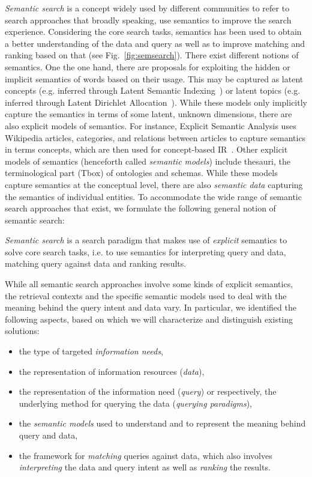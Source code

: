 \emph{Semantic search} is a concept widely used by different communities to refer to search approaches that broadly speaking, use semantics to improve the search experience. Considering the core search tasks, semantics has been used to obtain a better understanding of the data and query as well as to improve matching and ranking based on that (see Fig.~\ref{fig:semsearch}). There exist different notions of semantics. One the one hand, there are proposals for exploiting the hidden or implicit semantics of words based on their usage. This may be captured as latent concepts (e.g. inferred through Latent Semantic Indexing~\cite{DBLP:conf/sigir/Hofmann99}) or latent topics (e.g. inferred through Latent Dirichlet Allocation~\cite{DBLP:conf/sigir/WeiC06}). While these models only implicitly capture the semantics in terms of some latent, unknown dimensions, there are also explicit models of semantics. For instance, Explicit Semantic Analysis uses Wikipedia articles, categories, and relations between articles to capture semantics in terms concepts, which are then used for concept-based IR~\cite{DBLP:journals/tois/EgoziMG11}. Other explicit models of semantics (henceforth called \emph{semantic models}) include thesauri, the terminological part (Tbox) of ontologies and schemas. While these models capture semantics at the conceptual level, there are also \emph{semantic data} capturing the semantics of individual entities. To accommodate the wide range of semantic search approaches that exist, we formulate the following general notion of semantic search:

\begin{definition} \emph{Semantic search} is a search paradigm that makes use of \emph{explicit} semantics to solve core search tasks, i.e. to use semantics for interpreting query and data, matching query against data and ranking results. 
\end{definition}

While all semantic search approaches involve some kinds of explicit semantics, the retrieval contexts and the specific semantic models used to deal with the meaning behind the query intent and data vary. In particular, we identified the following aspects, based on which we will characterize and distinguish existing solutions:

\begin{itemize}
\item the type of targeted \emph{information needs},  
\item the representation of information resources (\emph{data}), 
\item the representation of the information need (\textit{query}) or respectively, the underlying method for querying the data (\emph{querying paradigms}), 
\item the \emph{semantic models} used to understand and to represent the meaning behind query and data, 
\item the framework for \emph{matching} queries against data, which also involves \emph{interpreting} the data and query intent as well as \emph{ranking} the results.  
\end{itemize}


